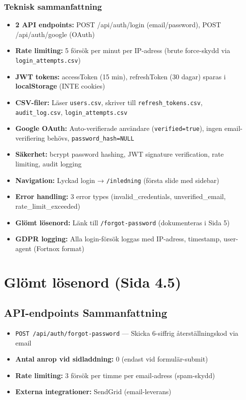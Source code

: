 \documentclass[12pt,a4paper]{article}
\begin{document}
\subsubsection{Teknisk sammanfattning}
\begin{itemize}[noitemsep]
  \item \textbf{2 API endpoints:} POST /api/auth/login (email/password), POST /api/auth/google (OAuth)
  \item \textbf{Rate limiting:} 5 försök per minut per IP-adress (brute force-skydd via \texttt{login\_attempts.csv})
  \item \textbf{JWT tokens:} accessToken (15 min), refreshToken (30 dagar) sparas i \textbf{localStorage} (INTE cookies)
  \item \textbf{CSV-filer:} Läser \texttt{users.csv}, skriver till \texttt{refresh\_tokens.csv}, \texttt{audit\_log.csv}, \texttt{login\_attempts.csv}
  \item \textbf{Google OAuth:} Auto-verifierade användare (\texttt{verified=true}), ingen email-verifiering behövs, \texttt{password\_hash=NULL}
  \item \textbf{Säkerhet:} bcrypt password hashing, JWT signature verification, rate limiting, audit logging
  \item \textbf{Navigation:} Lyckad login → \texttt{/inledning} (första slide med sidebar)
  \item \textbf{Error handling:} 3 error types (invalid\_credentials, unverified\_email, rate\_limit\_exceeded)
  \item \textbf{Glömt lösenord:} Länk till \texttt{/forgot-password} (dokumenteras i Sida 5)
  \item \textbf{GDPR logging:} Alla login-försök loggas med IP-adress, timestamp, user-agent (Fortnox format)
\end{itemize}

\newpage




\section{Glömt lösenord (Sida 4.5)}

\subsection{API-endpoints Sammanfattning}
\begin{itemize}[noitemsep]
  \item \texttt{POST /api/auth/forgot-password} — Skicka 6-siffrig återställningskod via email
  \item \textbf{Antal anrop vid sidladdning:} 0 (endast vid formulär-submit)
  \item \textbf{Rate limiting:} 3 försök per timme per email-adress (spam-skydd)
  \item \textbf{Externa integrationer:} SendGrid (email-leverans)
\end{itemize}
\end{document}
